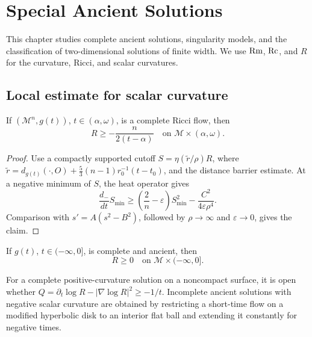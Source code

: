 \chapter{Special Ancient Solutions}
\label{ch:chow-iv-special-ancient-solutions}

This chapter studies complete ancient solutions, singularity models, and the
classification of two-dimensional solutions of finite width.  We use
\(\operatorname{Rm}\), \(\operatorname{Rc}\), and \(R\) for the curvature, Ricci, and scalar curvatures.

\section{Local estimate for scalar curvature}

\begin{theorem}
\label{thm:chow-iv-sharp-lower-scalar}
If \((\mathcal M^n,g(t))\), \(t\in(\alpha,\omega)\), is a complete Ricci
flow, then
\[
 R\ge -\frac{n}{2(t-\alpha)}\quad\text{on }\mathcal M\times(\alpha,\omega).
\]
\end{theorem}
\begin{proof}
Use a compactly supported cutoff \(S=\eta(\widetilde r/\rho)R\), where
\(\widetilde r=d_{g(t)}(\mathord\cdot,O)+\frac53(n-1)r_0^{-1}(t-t_0)\),
and the distance barrier estimate.  At a negative minimum of \(S\), the heat
operator gives
\[
 \frac{d_-}{dt}S_{\min}\ge
 \left(\frac2n-\varepsilon\right)S_{\min}^2-
 \frac{C^2}{4\varepsilon\rho^4}.
\]
Comparison with \(s'=A(s^2-B^2)\), followed by \(\rho\to\infty\) and
\(\varepsilon\to0\), gives the claim.
\end{proof}

\begin{corollary}
\label{cor:chow-iv-ancient-nonnegative-scalar}
If \(g(t)\), \(t\in(-\infty,0]\), is complete and ancient, then
\[
R\ge0\quad\text{on }\mathcal M\times(-\infty,0].
\]
\end{corollary}

\begin{remark}
\label{rem:chow-iv-problem-28-3}
For a complete positive-curvature solution on a noncompact surface, it is
open whether \(Q=\partial_t\log R-|\nabla\log R|^2\ge-1/t\).  Incomplete
ancient solutions with negative scalar curvature are obtained by restricting
a short-time flow on a modified hyperbolic disk to an interior flat ball and
extending it constantly for negative times.
\end{remark}

